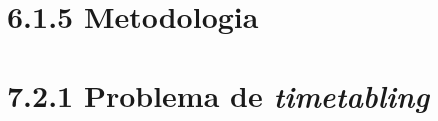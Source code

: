 \chapter*{6.1.5 Metodologia}






\chapter{7.2.1 Problema de \textit{timetabling}}

\cite{Wren1996}


\cite{Alencar2019}

\cite{Wren1996}


\cite{Alencar2019}


\cite{Dunke2023} %







